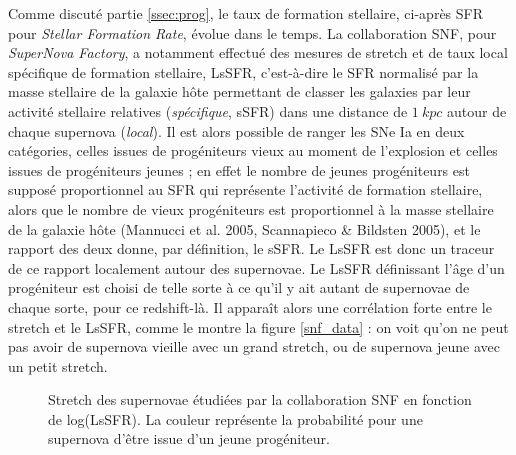 \documentclass[a4paper, 12pt, svgnames]{article}
\begin{document}
Comme discuté partie \ref{ssec:prog}, le taux de formation stellaire, ci-après
SFR pour \textit{Stellar Formation Rate}, évolue dans le temps. La collaboration
SNF, pour \textit{SuperNova Factory}, a notamment effectué des mesures de
stretch et de taux local spécifique de formation stellaire, LsSFR, c'est-à-dire
le SFR normalisé par la masse stellaire de la galaxie hôte permettant de classer
les galaxies par leur activité stellaire relatives (\textit{spécifique}, sSFR)
dans une distance de $\SI{1}{kpc}$ autour de chaque supernova (\textit{local}).
Il est alors possible de ranger les SNe Ia en deux catégories, celles issues de
progéniteurs vieux au moment de l'explosion et celles issues de progéniteurs
jeunes ; en effet le nombre de jeunes progéniteurs est supposé proportionnel au
SFR qui représente l'activité de formation stellaire, alors que le nombre de
vieux progéniteurs est proportionnel à la masse stellaire de la galaxie hôte
(Mannucci et al. 2005, Scannapieco \& Bildsten 2005), et le rapport des deux
donne, par définition, le sSFR. Le LsSFR est donc un traceur de ce rapport
localement autour des supernovae. Le LsSFR définissant l'âge d'un progéniteur
est choisi de telle sorte à ce qu'il y ait autant de supernovae de chaque sorte,
pour ce redshift-là. Il apparaît alors une corrélation forte entre
le stretch et le LsSFR, comme le montre la figure \ref{snf_data} : on voit qu'on
ne peut pas avoir de supernova vieille avec un grand stretch, ou de supernova
jeune avec un petit stretch.

\begin{figure}[htbp!]
    \centering
    \captionsetup{justification=centering}
    \caption{Stretch des supernovae étudiées par la collaboration SNF en
    fonction de log(LsSFR). La couleur représente la probabilité pour une
supernova d'être issue d'un jeune progéniteur.}
\end{figure}
\end{document}
